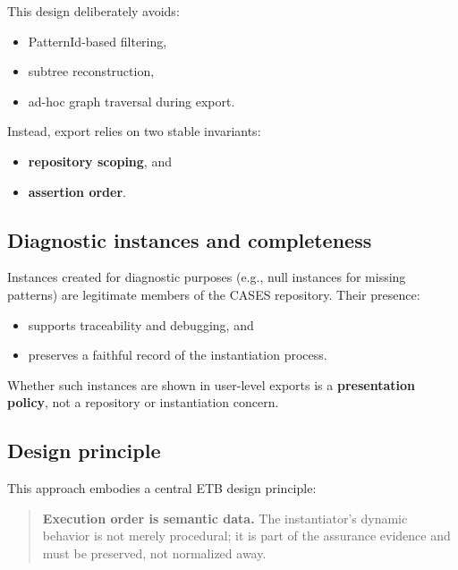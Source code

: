 \documentclass[12pt,twoside,a4paper]{article}
\begin{document}
This design deliberately avoids:

\begin{itemize}
  \item PatternId-based filtering,
  \item subtree reconstruction,
  \item ad-hoc graph traversal during export.
\end{itemize}

Instead, export relies on two stable invariants:

\begin{itemize}
  \item \textbf{repository scoping}, and
  \item \textbf{assertion order}.
\end{itemize}

\subsection{Diagnostic instances and completeness}
\label{subsec:diagnostic-instances}

Instances created for diagnostic purposes (e.g., null instances for missing patterns) are legitimate members of the CASES repository. Their presence:

\begin{itemize}
  \item supports traceability and debugging, and
  \item preserves a faithful record of the instantiation process.
\end{itemize}

Whether such instances are shown in user-level exports is a \textbf{presentation policy}, not a repository or instantiation concern.

\subsection{Design principle}
\label{subsec:design-principle-instantiation}

This approach embodies a central ETB design principle:

\begin{quote}
\textbf{Execution order is semantic data.}  
The instantiator’s dynamic behavior is not merely procedural; it is part of the assurance evidence and must be preserved, not normalized away.
\end{quote}
\end{document}
